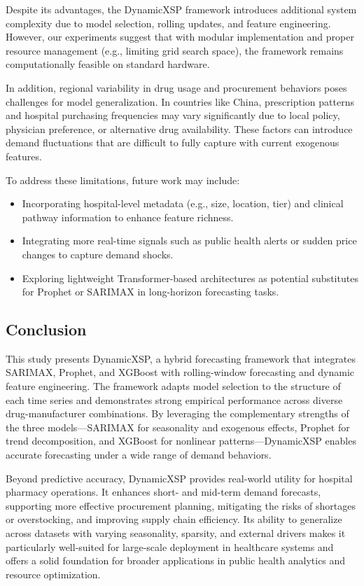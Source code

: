 \documentclass[12pt]{article}
\begin{document}
Despite its advantages, the DynamicXSP framework introduces additional system complexity due to model selection, rolling updates, and feature engineering. However, our experiments suggest that with modular implementation and proper resource management (e.g., limiting grid search space), the framework remains computationally feasible on standard hardware.

In addition, regional variability in drug usage and procurement behaviors poses challenges for model generalization. In countries like China, prescription patterns and hospital purchasing frequencies may vary significantly due to local policy, physician preference, or alternative drug availability. These factors can introduce demand fluctuations that are difficult to fully capture with current exogenous features.

To address these limitations, future work may include:
\begin{itemize}
    \item Incorporating hospital-level metadata (e.g., size, location, tier) and clinical pathway information to enhance feature richness.
    \item Integrating more real-time signals such as public health alerts or sudden price changes to capture demand shocks.
    \item Exploring lightweight Transformer-based architectures as potential substitutes for Prophet or SARIMAX in long-horizon forecasting tasks.
\end{itemize}

\subsection{Conclusion}

This study presents DynamicXSP, a hybrid forecasting framework that integrates SARIMAX, Prophet, and XGBoost with rolling-window forecasting and dynamic feature engineering. The framework adapts model selection to the structure of each time series and demonstrates strong empirical performance across diverse drug-manufacturer combinations. By leveraging the complementary strengths of the three models—SARIMAX for seasonality and exogenous effects, Prophet for trend decomposition, and XGBoost for nonlinear patterns—DynamicXSP enables accurate forecasting under a wide range of demand behaviors.

Beyond predictive accuracy, DynamicXSP provides real-world utility for hospital pharmacy operations. It enhances short- and mid-term demand forecasts, supporting more effective procurement planning, mitigating the risks of shortages or overstocking, and improving supply chain efficiency. Its ability to generalize across datasets with varying seasonality, sparsity, and external drivers makes it particularly well-suited for large-scale deployment in healthcare systems and offers a solid foundation for broader applications in public health analytics and resource optimization.
\end{document}
